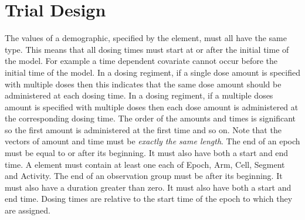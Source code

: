 \section{Trial Design}

\begin{valrules}
 The values of a demographic,
specified by the  element, must all have the same
type.
 This
means that all dosing times must start at or after the initial time of
the model.
 For example a time dependent covariate cannot occur
before the initial time of the model.
 In a
dosing regiment, if a single dose amount is specified with multiple
doses then this indicates that the same dose amount should be
administered at each dosing time.
 In a
dosing regiment, if a multiple doses amount is specified with multiple
doses then each dose amount is administered at the corresponding
dosing time. The order of the amounts and times is significant so the
first amount is administered at the first time and so on. Note that
the vectors of amount and time must be \emph{exactly the same length}.
 The end of an epoch
must be equal to or after its beginning. It must also have both a start and end time.
 A 
element must contain at least one each of Epoch, Arm, Cell, Segment
and Activity.
 The end
of an observation group must be after its beginning. It must also have
a duration greater than zero. It must also have both a start and end
time.
 Dosing times are
relative to the start time of the epoch to which they are assigned.
%
\end{valrules}





